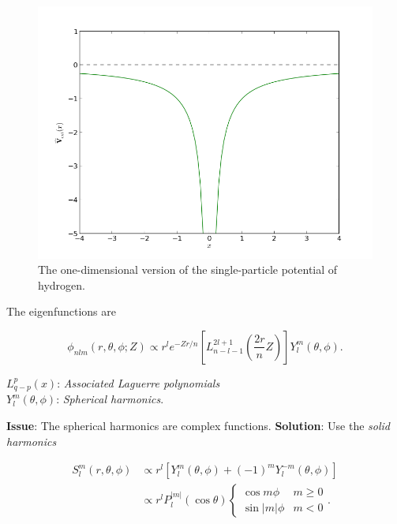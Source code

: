 \begin{frame}
\begin{figure}
 \begin{center}
  \includegraphics[scale=0.4]{../graphics/Potentials/hydrogen.png}
  \caption{The one-dimensional version of the single-particle potential of hydrogen.}
  \label{fig:extPotHydrogen}
 \end{center}
\end{figure}
\end{frame}

\begin{frame}
 The eigenfunctions are
 
 \begin{equation*}
 \phi_{nlm}(r, \theta, \phi; Z) \propto r^l e^{-Zr/n}\left[L_{n-l-1}^{2l+1}\left(\frac{2r}{n}Z\right)\right] Y_l^m(\theta, \phi).
\end{equation*}

$L_{q-p}^p(x)$: \textit{Associated Laguerre polynomials} \\
$Y_l^m(\theta, \phi)$: \textit{Spherical harmonics}. 
% 

\end{frame}

\begin{frame}
 \textbf{Issue}: The spherical harmonics are complex functions. 
 \shift
 \textbf{Solution}: Use the \textit{solid harmonics}
 
 \begin{align*}
S_l^m(r, \theta, \phi) &\propto r^l\left[Y_l^m(\theta, \phi) + (-1)^m Y_l^{-m}(\theta, \phi)\right] \\
 &\propto r^{l} P_l^{|m|}(\cos\theta) \begin{cases} \cos m\phi & m \ge 0 \\ \sin|m|\phi &  m < 0 \end{cases}.     
\end{align*}

 \end{frame}
 
